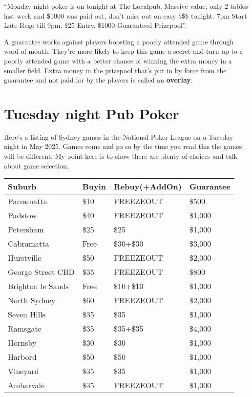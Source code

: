 ``Monday night poker is on tonight at The Localpub. Massive value, only 2
tables last week and \$1000 was paid out, don't miss out on easy
\$\$\$ tonight. 7pm Start Late Rego till 9pm. \$25 Entry. \$1000
Guaranteed Prizepool''.

A guarantee works against players boosting a poorly
attended game through word of mouth. They're more likely to keep this
game a secret and turn up to a poorly attended game with a better
chance of winning the extra money in a smaller field. Extra money in
the prizepool that's put in by force from the guarantee and not paid
for by the players is called an \textbf{overlay}.


\section{Tuesday night Pub Poker}

Here's a listing of Sydney games in the National Poker League
on a Tuesday night in May 2025. Games come and go so by the time you
read this the games will be different. My point here is to show there
are plenty of choices and talk about game selection.


\begin{tabular}{|l|l|l|l|} \hline
Suburb & Buyin & Rebuy(+AddOn) & Guarantee \\ \hline
Parramatta        & \$10 & FREEZEOUT & \$500 \\ \hline
Padstow           & \$40 & FREEZEOUT & \$1,000 \\ \hline
Petersham         & \$25 & \$25      & \$1,000 \\ \hline
Cabramatta        & Free & \$30+\$30 & \$3,000 \\ \hline
Hurstville        & \$50 & FREEZEOUT & \$2,000 \\ \hline
George Street CBD & \$35 & FREEZEOUT & \$800 \\ \hline
Brighton le Sands & Free & \$10+\$10 & \$1,000 \\ \hline
North Sydney      & \$60 & FREEZEOUT & \$2,000 \\ \hline
Seven Hills       & \$35 & \$35      & \$1,000 \\ \hline
Ramsgate          & \$35 & \$35+\$35 & \$4,000 \\ \hline
Hornsby           & \$30 & \$30      & \$1,000 \\ \hline
Harbord           & \$50 & \$50      & \$1,000 \\ \hline
Vineyard          & \$35 & \$35      & \$1,000 \\ \hline
Ambarvale         & \$35 & FREEZEOUT & \$1,000 \\ \hline
\end{tabular}

